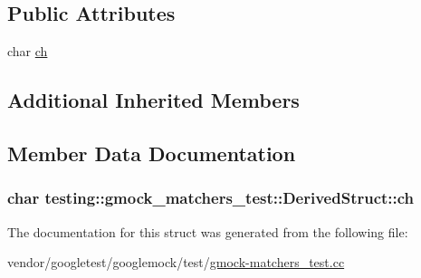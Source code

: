 \subsection*{Public Attributes}
\begin{DoxyCompactItemize}
\item 
char \hyperlink{structtesting_1_1gmock__matchers__test_1_1DerivedStruct_abd7de960817b2c889f109ae6f2869f4c}{ch}
\end{DoxyCompactItemize}
\subsection*{Additional Inherited Members}


\subsection{Member Data Documentation}
\subsubsection[{\texorpdfstring{ch}{ch}}]{\setlength{\rightskip}{0pt plus 5cm}char testing\+::gmock\+\_\+matchers\+\_\+test\+::\+Derived\+Struct\+::ch}\hypertarget{structtesting_1_1gmock__matchers__test_1_1DerivedStruct_abd7de960817b2c889f109ae6f2869f4c}{}\label{structtesting_1_1gmock__matchers__test_1_1DerivedStruct_abd7de960817b2c889f109ae6f2869f4c}


The documentation for this struct was generated from the following file\+:\begin{DoxyCompactItemize}
\item 
vendor/googletest/googlemock/test/\hyperlink{gmock-matchers__test_8cc}{gmock-\/matchers\+\_\+test.\+cc}\end{DoxyCompactItemize}
